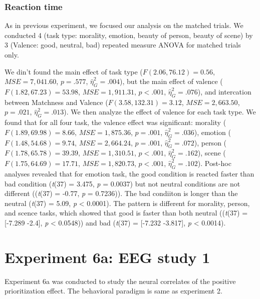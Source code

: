 \documentclass[man]{apa6}
\begin{document}
\hypertarget{reaction-time}{%
\subsubsection{Reaction time}\label{reaction-time}}

As in previous experiment, we focused our analysis on the matched trials. We conducted 4 (task type: morality, emotion, beauty of person, beauty of scene) by 3 (Valence: good, neutral, bad) repeated measure ANOVA for matched trials only.

We din't found the main effect of task type (\(F(2.06, 76.12) = 0.56\), \(\mathit{MSE} = 7,041.60\), \(p = .577\), \(\hat{\eta}^2_G = .004\)), but the main effect of valence (\(F(1.82, 67.23) = 53.98\), \(\mathit{MSE} = 1,911.31\), \(p < .001\), \(\hat{\eta}^2_G = .076\)), and intercation between Matchness and Valence (\(F(3.58, 132.31) = 3.12\), \(\mathit{MSE} = 2,663.50\), \(p = .021\), \(\hat{\eta}^2_G = .013\)). We then analyze the effect of valence for each task type. We found that for all four task, the valence effect was significant: morality (\(F(1.89, 69.98) = 8.66\), \(\mathit{MSE} = 1,875.36\), \(p = .001\), \(\hat{\eta}^2_G = .036\)), emotion (\(F(1.48, 54.68) = 9.74\), \(\mathit{MSE} = 2,664.24\), \(p = .001\), \(\hat{\eta}^2_G = .072\)), person (\(F(1.78, 65.78) = 39.39\), \(\mathit{MSE} = 1,310.51\), \(p < .001\), \(\hat{\eta}^2_G = .162\)), scene (\(F(1.75, 64.69) = 17.71\), \(\mathit{MSE} = 1,820.73\), \(p < .001\), \(\hat{\eta}^2_G = .102\)). Post-hoc analyses revealed that for emotion task, the good condition is reacted faster than bad condition (\emph{t}(37) = 3.475, \emph{p} = 0.0037) but not neutral conditions are not different ((\emph{t}(37) = -0.77, \emph{p} = 0.7236)). The bad condiiton is longer than the neutral (\emph{t}(37) = 5.09, \emph{p} \textless{} 0.0001). The pattern is different for morality, person, and scence tasks, which showed that good is faster than both neutral ((\emph{t}(37) = {[}-7.289 -2.4{]}, \emph{p} \textless{} 0.0548)) and bad (\emph{t}(37) = {[}-7.232 -3.817{]}, \emph{p} \textless{} 0.0014).

\hypertarget{experiment-6a-eeg-study-1}{%
\section{Experiment 6a: EEG study 1}\label{experiment-6a-eeg-study-1}}

Experiment 6a was conducted to study the neural correlates of the positive prioritization effect. The behavioral paradigm is same as experiment 2.
\end{document}
